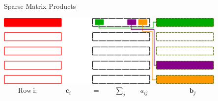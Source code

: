 \begin{frame}{Sparse Matrix Products}

\begin{center}
 \includegraphics[width=0.85\textwidth]{figures/spgemm-matrix-3} \\
 \begin{align*}
  \mathrm{Row\ i:} \qquad \qquad \mathbf{c}_i \qquad \quad =\qquad \sum_{j} \qquad a_{ij} \qquad \qquad \qquad \mathbf{b}_j \qquad \qquad \qquad
 \end{align*}
\end{center}

\end{frame}
























